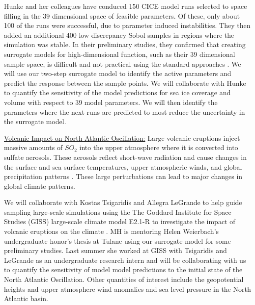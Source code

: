 \documentclass[11pt]{NSFamsart}
\begin{document}
   
Hunke and her colleagues have conduced 150 CICE model runs selected to space filling in the 39 dimensional  space of feasible  parameters.   Of these, only about 100 of the runs were successful, due to parameter induced instabilities.  They then added an additional 400 low discrepancy Sobol samples in regions where the simulation was stable.  In their preliminary studies, they confirmed that creating surrogate models for high-dimensional function, such as their 39 dimensional sample space, is difficult and not practical using the standard approaches \cite{bengio2006curse, o2010oxford}.  We will use our two-step surrogate model to identify the active parameters \cite{constantine2014active} and predict the response between the sample points.  
We will collaborate with Hunke to quantify the sensitivity of the model predictions for sea ice coverage and volume with respect to 39 model parameters.  We will then identify the parameters where the next runs are predicted to most reduce the uncertainty in the surrogate model.
    
  
\underline{Volcanic Impact on North Atlantic Oscillation:}
Large volcanic eruptions inject massive amounts of ${SO_2}$ into the upper atmosphere where it is converted into sulfate aerosols.  These aerosols reflect short-wave radiation and cause changes in the surface and sea surface temperatures, upper atmospheric winds, and  global precipitation patterns \cite{zanchettin2013background, legrande2015volcanic}.  
These large perturbations can lead to  major changes in global climate patterns.

We will collaborate with Kostas Tsigaridis and Allegra LeGrande to help guide sampling large-scale simulations using the The Goddard Institute for Space Studies (GISS) large-scale climate model E2.1-R to investigate the impact of volcanic eruptions on the climate
\cite{zanchettin2016model}.  MH is mentoring Helen Weierbach's undergraduate honor's thesis at Tulane using our surrogate model for some preliminary studies.  Last summer she worked at GISS with Tsigaridis and LeGrande as an undergraduate research intern and will be collaborating with us to quantify the sensitivity of model model predictions to the initial state of the North Atlantic Oscillation. Other quantities of interest include the geopotential heights and upper atmosphere wind anomalies and sea level pressure in the North Atlantic basin. 
\end{document}
